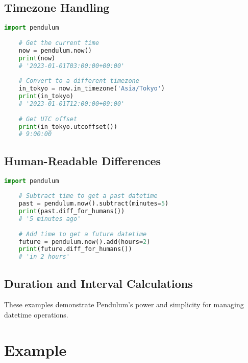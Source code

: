 \subsection{Timezone Handling}

\begin{lstlisting}[language=Python, caption={Working with Current Time and Timezones in Pendulum}, label={code:pendulum-current-time}, style=pythonstyle]
	import pendulum
	
	# Get the current time
	now = pendulum.now()
	print(now)
	# '2023-01-01T03:00:00+00:00'
	
	# Convert to a different timezone
	in_tokyo = now.in_timezone('Asia/Tokyo')
	print(in_tokyo)
	# '2023-01-01T12:00:00+09:00'
	
	# Get UTC offset
	print(in_tokyo.utcoffset())
	# 9:00:00
\end{lstlisting}


\subsection{Human-Readable Differences}

\begin{lstlisting}[language=Python, caption={Human-Readable Time Differences with Pendulum}, label={code:pendulum-human-readable}, style=pythonstyle]
	import pendulum
	
	# Subtract time to get a past datetime
	past = pendulum.now().subtract(minutes=5)
	print(past.diff_for_humans())
	# '5 minutes ago'
	
	# Add time to get a future datetime
	future = pendulum.now().add(hours=2)
	print(future.diff_for_humans())
	# 'in 2 hours'
\end{lstlisting}

\subsection{Duration and Interval Calculations}


{
		
}


These examples demonstrate Pendulum's power and simplicity for managing datetime operations.

\section{Example}

